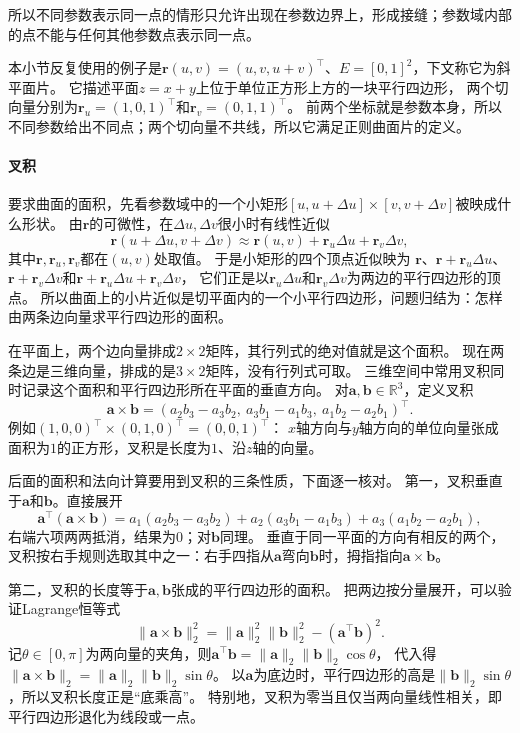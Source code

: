 所以不同参数表示同一点的情形只允许出现在参数边界上，形成接缝；参数域内部的点不能与任何其他参数点表示同一点。

本小节反复使用的例子是$\bm r(u,v)=(u,v,u+v)^\top$、$E=[0,1]^2$，下文称它为斜平面片。
它描述平面$z=x+y$上位于单位正方形上方的一块平行四边形，
两个切向量分别为$\bm r_u=(1,0,1)^\top$和$\bm r_v=(0,1,1)^\top$。
前两个坐标就是参数本身，所以不同参数给出不同点；两个切向量不共线，所以它满足正则曲面片的定义。

\paragraph{叉积}

要求曲面的面积，先看参数域中的一个小矩形$[u,u+\Delta u]\times[v,v+\Delta v]$被映成什么形状。
由$\bm r$的可微性，在$\Delta u,\Delta v$很小时有线性近似
\[
 \bm r(u+\Delta u,v+\Delta v)\approx\bm r(u,v)+\bm r_u\Delta u+\bm r_v\Delta v,
\]
其中$\bm r,\bm r_u,\bm r_v$都在$(u,v)$处取值。
于是小矩形的四个顶点近似映为
$\bm r$、$\bm r+\bm r_u\Delta u$、$\bm r+\bm r_v\Delta v$和$\bm r+\bm r_u\Delta u+\bm r_v\Delta v$，
它们正是以$\bm r_u\Delta u$和$\bm r_v\Delta v$为两边的平行四边形的顶点。
所以曲面上的小片近似是切平面内的一个小平行四边形，问题归结为：怎样由两条边向量求平行四边形的面积。

在平面上，两个边向量排成$2\times2$矩阵，其行列式的绝对值就是这个面积。
现在两条边是三维向量，排成的是$3\times2$矩阵，没有行列式可取。
三维空间中常用叉积同时记录这个面积和平行四边形所在平面的垂直方向。
对$\bm a,\bm b\in\mathbb R^3$，定义叉积
\[
 \bm a\times\bm b
 =(a_2b_3-a_3b_2,\ a_3b_1-a_1b_3,\ a_1b_2-a_2b_1)^\top.
\]
例如$(1,0,0)^\top\times(0,1,0)^\top=(0,0,1)^\top$：
$x$轴方向与$y$轴方向的单位向量张成面积为$1$的正方形，叉积是长度为$1$、沿$z$轴的向量。

后面的面积和法向计算要用到叉积的三条性质，下面逐一核对。
第一，叉积垂直于$\bm a$和$\bm b$。直接展开
\[
 \bm a^\top(\bm a\times\bm b)
 =a_1(a_2b_3-a_3b_2)+a_2(a_3b_1-a_1b_3)+a_3(a_1b_2-a_2b_1),
\]
右端六项两两抵消，结果为$0$；对$\bm b$同理。
垂直于同一平面的方向有相反的两个，叉积按右手规则选取其中之一：右手四指从$\bm a$弯向$\bm b$时，拇指指向$\bm a\times\bm b$。

第二，叉积的长度等于$\bm a,\bm b$张成的平行四边形的面积。
把两边按分量展开，可以验证Lagrange恒等式
\[
 \lVert\bm a\times\bm b\rVert_2^2
 =\lVert\bm a\rVert_2^2\lVert\bm b\rVert_2^2-(\bm a^\top\bm b)^2.
\]
记$\theta\in[0,\pi]$为两向量的夹角，则$\bm a^\top\bm b=\lVert\bm a\rVert_2\lVert\bm b\rVert_2\cos\theta$，
代入得$\lVert\bm a\times\bm b\rVert_2=\lVert\bm a\rVert_2\lVert\bm b\rVert_2\sin\theta$。
以$\bm a$为底边时，平行四边形的高是$\lVert\bm b\rVert_2\sin\theta$，所以叉积长度正是“底乘高”。
特别地，叉积为零当且仅当两向量线性相关，即平行四边形退化为线段或一点。

